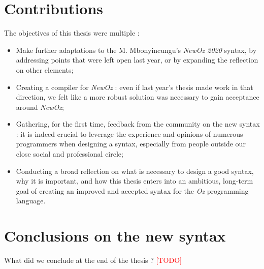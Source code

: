 \section{Contributions}\label{sec:ch1-3}
The objectives of this thesis were multiple :
\begin{itemize}
    \item Make further adaptations to the M. Mbonyincungu's \textit{NewOz 2020} syntax, by addressing points that were left open last year, or by expanding the reflection on other elements;
    \item Creating a compiler for \textit{NewOz} : even if last year's thesis made work in that direction, we felt like a more robust solution was necessary to gain acceptance around \textit{NewOz};
    \item Gathering, for the first time, feedback from the community on the new syntax : it is indeed crucial to leverage the experience and opinions of numerous programmers when designing a syntax, especially from people outside our close social and professional circle;
    \item Conducting a broad reflection on what is necessary to design a good syntax, why it is important, and how this thesis enters into an ambitious, long-term goal of creating an improved and accepted syntax for the \textit{Oz} programming language.
\end{itemize}

\section{Conclusions on the new syntax}\label{sec:ch1-4}
What did we conclude at the end of the thesis ? \textcolor{red}{[TODO]}